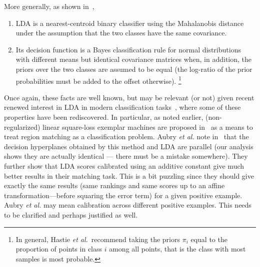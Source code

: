 \documentclass[12pt,letterpaper]{article}
\begin{document}
More generally, as shown in~\cite{Hastie2009},
\begin{enumerate}
\item LDA is a nearest-centroid binary classifier using the
Mahalanobis distance under the assumption that the two classes
have the same covariance.
\item Its decision function is a Bayes classification rule for normal
distributions with different means but identical covariance matrices
when, in addition, the priors over the two classes are assumed to be
equal (the log-ratio of the prior probabilities must be added to the
offset otherwise). \footnote{In general, Hastie
{\em et al.}~recommend taking the priors $\pi_i$ equal to the proportion of points
in class $i$ among all points, that is the class with most samples is
most probable.}
\end{enumerate}
 
Once again, these facts are well known, but may be relevant (or not)
given recent renewed interest in LDA in modern classification
tasks~\cite{GMPD12,HMR12}, where some of these properties have been
rediscovered. In particular, as noted earlier, (non-regularized)
linear square-loss exemplar machines are proposed in~\cite{ARS14} as a
means to treat region matching as a classification problem. Aubry {\em
et al.} note in~\cite{ARS14} that the decision hyperplanes obtained by
this method and LDA are parallel (our analysis shows they are actually
identical --- there must be a mistake somewhere). They further show
that LDA scores calibrated using an additive constant give much better
results in their matching task. This is a bit puzzling since they
should give exactly the same results (same rankings and same scores up
to an affine transformation---before squaring the error term) for a
given positive example. Aubry {\em et al.} may mean calibration across
different positive examples. This needs to be clarified and perhaps
justified as well.
 
 
 


\end{document}
